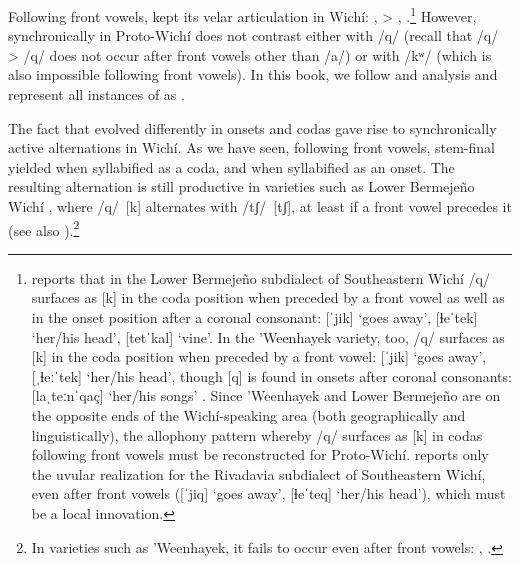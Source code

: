 \begin{exe}
    \ex \palm
    \ex \yicalhuk
    \ex \powder
    \ex \feces
    \ex \wildmanioc
    \ex \rope
    \ex \two
    \ex \fence
    \ex \river
    \ex \blind
    \ex \unclesg
    \ex \duraznillo
    \ex \silkfloss
    \ex \leniosasg
    \ex \badmood
    \ex \palosanto
    \ex \firewoodhuk
\end{exe}

Following front vowels,  kept its velar articulation in Wichí: ,  > , .\footnote{\citet[49]{VN14} reports that in the Lower Bermejeño subdialect of Southeastern Wichí /q/ surfaces as [k] in the coda position when preceded by a front vowel as well as in the onset position after a coronal consonant: [ˈjik] `goes away', [ɬeˈtek] `her/his head', [tetˈkal] `vine'. In the ’Weenhayek variety, too, /q/ surfaces as [k] in the coda position when preceded by a front vowel: [ˈjik] `goes away', [ˌɬeːˈtek] `her/his head', though [q] is found in onsets after coronal consonants: [laˌteːnˈqaç] `her/his songs' \citep[16--17]{KC94}. Since ’Weenhayek and Lower Bermejeño are on the opposite ends of the Wichí-speaking area (both geographically and linguistically), the allophony pattern whereby /q/ surfaces as [k] in codas following front vowels must be reconstructed for Proto-Wichí. \citet[25]{JT09-th} reports only the uvular realization for the Rivadavia subdialect of Southeastern Wichí, even after front vowels ([ˈjiq] `goes away', [ɬeˈteq] `her/his head'), which must be a local innovation.} However, synchronically in Proto-Wichí  does not contrast either with \intxt{*}/q/ (recall that /q/ > /q/ does not occur after front vowels other than \intxt{*}/a/) or with \intxt{*}/kʷ/ (which is also impossible following front vowels). In this book, we follow  and  analysis and represent all instances of  as .

\begin{exe}
    \ex \goaway
    \ex \mortar
    \ex \bilecw
    \ex \allrcpr
    \ex \headn
    \ex \temperance
    \ex \wildhoney
    \ex \eatvi
\end{exe}

The fact that  evolved differently in onsets and codas gave rise to synchronically active alternations in Wichí. As we have seen, following front vowels, stem-final  yielded  when syllabified as a coda, and  when syllabified as an onset. The resulting alternation is still productive in varieties such as Lower Bermejeño Wichí , where /q/~[k] alternates with /tʃ/~[tʃ], at least if a front vowel precedes it (see also \cites[123]{MC09}).\footnote{In varieties such as 'Weenhayek, it fails to occur even after front vowels: ,  \citep[17]{KC94}.}

